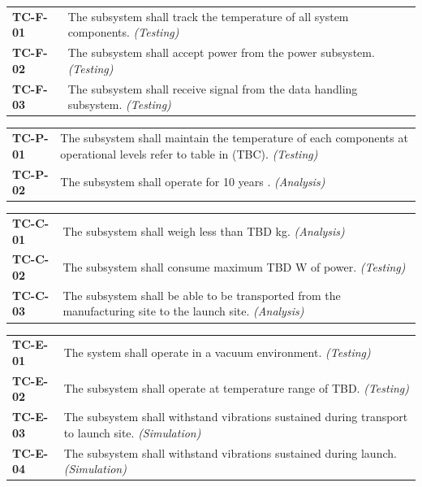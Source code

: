 \documentclass[12pt, letterpaper]{article}
\begin{document}
\vspace{-5pt}
\begin{longtable}{P{2cm}P{13.75cm}}
\textbf{TC-F-01}	& The subsystem shall track the temperature of all system components. \textit{(Testing)}								\\
\textbf{TC-F-02}	& The subsystem shall accept power from the power subsystem. \textit{(Testing)}										\\
\textbf{TC-F-03}	& The subsystem shall receive signal from the data handling subsystem. \textit{(Testing)}								\\
\end{longtable}
\vspace{-10pt}
\begin{longtable}{P{2cm}P{13.75cm}}
\textbf{TC-P-01}	& The subsystem shall maintain the temperature of each components at operational levels refer to table in  (TBC). \textit{(Testing)}							\\
\textbf{TC-P-02}	& The subsystem shall operate for 10 years \cite{RFP}. \textit{(Analysis)}										\\
\end{longtable}
\vspace{-10pt}
\begin{longtable}{P{2cm}P{13.75cm}}
\textbf{TC-C-01}	& The subsystem shall weigh less than TBD \si{\kg}. \textit{(Analysis)}													\\
\textbf{TC-C-02}	& The subsystem shall consume maximum TBD \si{\watt} of power. \textit{(Testing)}								\\
\textbf{TC-C-03}	& The subsystem shall be able to be transported from the manufacturing site to the launch site. \textit{(Analysis)}	\\
\end{longtable}
\vspace{-10pt}
\begin{longtable}{P{2cm}P{13.75cm}}
\textbf{TC-E-01}	& The system shall operate in a vacuum environment. \textit{(Testing)}													\\
\textbf{TC-E-02}	& The subsystem shall operate at temperature range of TBD. \textit{(Testing)}											\\
\textbf{TC-E-03}	& The subsystem shall withstand vibrations sustained during transport to launch site. \textit{(Simulation)}		\\
\textbf{TC-E-04}	& The subsystem shall withstand vibrations sustained during launch. \textit{(Simulation)}						\\
\end{longtable}
\end{document}
